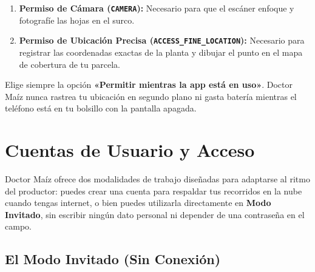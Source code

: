 \documentclass[11pt,a4paper]{report}
\begin{document}
\begin{enumerate}[leftmargin=1.4em,itemsep=1.5pt,topsep=2pt,partopsep=0pt,parsep=0pt]
    \item \textbf{Permiso de Cámara (\texttt{CAMERA}):} Necesario para que el escáner enfoque y fotografíe las hojas en el surco.
    \item \textbf{Permiso de Ubicación Precisa (\texttt{ACCESS\_FINE\_LOCATION}):} Necesario para registrar las coordenadas exactas de la planta y dibujar el punto en el mapa de cobertura de tu parcela.
\end{enumerate}

\vspace{1mm}
\begin{campotip}[top=2.5mm,bottom=2.5mm,left=3.5mm,right=3.5mm]
    Elige siempre la opción \textbf{«Permitir mientras la app está en uso»}. Doctor Maíz nunca rastrea tu ubicación en segundo plano ni gasta batería mientras el teléfono está en tu bolsillo con la pantalla apagada.
\end{campotip}

\chapter{Cuentas de Usuario y Acceso}

Doctor Maíz ofrece dos modalidades de trabajo diseñadas para adaptarse al ritmo del productor: puedes crear una cuenta para respaldar tus recorridos en la nube cuando tengas internet, o bien puedes utilizarla directamente en \textbf{Modo Invitado}, sin escribir ningún dato personal ni depender de una contraseña en el campo.

\section{El Modo Invitado (Sin Conexión)}
\end{document}
